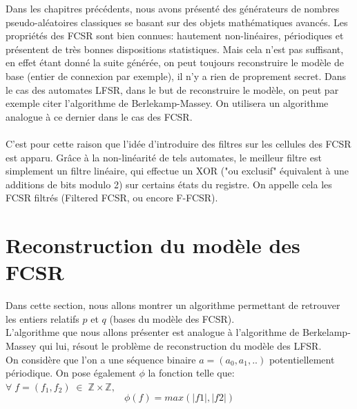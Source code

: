 \documentclass[11pt]{report}
\begin{document}
	Dans les chapitres précédents, nous avons présenté des générateurs de nombres pseudo-aléatoires classiques se basant sur des objets mathématiques avancés. Les propriétés des FCSR sont bien connues: hautement non-linéaires, périodiques et présentent de très bonnes dispositions statistiques. Mais cela n'est pas suffisant, en effet étant donné la suite générée, on peut toujours reconstruire le modèle de base (entier de connexion par exemple), il n'y a rien de proprement secret.  Dans le cas des automates LFSR, dans le but de reconstruire le modèle, on peut par exemple citer l'algorithme de Berlekamp-Massey. On utilisera un algorithme analogue à ce dernier dans le cas des FCSR. 
	\\
	\\	
	C'est pour cette raison que l'idée d'introduire des filtres sur les cellules des FCSR est apparu. Grâce à la non-linéarité de tels automates, le meilleur filtre est simplement un filtre linéaire, qui effectue un XOR ("ou exclusif" équivalent à une additions de bits modulo 2) sur certains états du registre. On appelle cela les FCSR filtrés (Filtered FCSR, ou encore F-FCSR). 

\section{Reconstruction du modèle des FCSR}

	Dans cette section, nous allons montrer un algorithme permettant de retrouver les entiers relatifs $p$ et $q$ (bases du modèle des FCSR). 
	 \\
	 L'algorithme que nous allons présenter est analogue à l'algorithme de Berkelamp-Massey qui lui, résout le problème de reconstruction du modèle des LFSR. \\
	 On considère que l'on a une séquence binaire $a = (a_0,a_1,..)$ potentiellement périodique. On pose également $\phi$ la fonction telle que:\\
	 $\forall \; f=(f_1,f_2) \; \in \; \mathbb{Z} \times \mathbb{Z},$\\
	 $$\phi(f)=max(|f1|,|f2|)$$
	 
\end{document}
